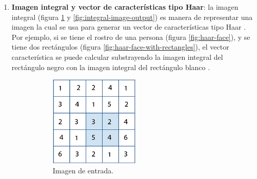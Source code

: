 \documentclass[a4paper,openright,12pt]{report}
\begin{document}
\begin{enumerate}
    \item \textbf{Imagen integral y vector de características tipo Haar}:
    la imagen integral (figura \ref{fig:integral-image-input} y
    \ref{fig:integral-image-output}) es manera de representar una imagen
    la cual se usa para generar un vector de características tipo Haar
    \cite{violajones}. Por ejemplo, si se tiene el rostro de una persona
    (figura \ref{fig:haar-face}), y se tiene dos rectángulos
    (figura \ref{fig:haar-face-with-rectangles}), el vector característica se
    puede calcular substrayendo la imagen integral del rectángulo negro con la
    imagen integral del rectángulo blanco \cite{wang2014analysis}.

    \begin{figure}[H]
      \begin{subfigure}[b]{0.4\textwidth}
        \includegraphics[width=\textwidth]{../images/integral-image-input.png}
        \caption{Imagen de entrada.}
        \label{fig:integral-image-input}
      \end{subfigure}
      \hfill
      \begin{subfigure}[b]{0.4\textwidth}

\end{subfigure}
\end{figure}
\end{enumerate}
\end{document}
